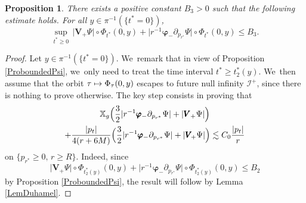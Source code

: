 \documentclass[10pt]{amsart}
\newcommand\mto{\mathchoice{\longmapsto}{\mapsto}{\mapsto}{\mapsto}}
\theoremstyle{plain}
\newtheorem{proposition}{Proposition}[section]
\theoremstyle{definition}
\newcommand\T{{\mathbb{X}}}
\begin{document}
\begin{proposition}\label{ProfinalPsideriv}
There exists a positive constant $B_3>0$ such that the following estimate holds. For all $y \in \pi^{-1}(\{t^* =0 \})$,
\[
\sup_{t^* \geq 0} \, \big| \pmb{V}_{\! +}\Psi \big|\circ \Phi_{t^*}(0,y)+\big|r^{-1} \pmb{\varphi}_- \partial_{p_{r^*}} \Psi \big|\circ \Phi_{t^*}(0,y) \leq B_3.
\]
\end{proposition}

\begin{proof}
Let $y \in \pi^{-1}(\{t^* =0 \})$. We~remark that in view of Proposition \ref{ProboundedPsi}, we~only need to treat the time interval $t^* \geq t_2^*(y)$. We~then assume that the orbit $\tau \mto \Phi_\tau(0,y)$ escapes to future null infinity $\mathcal{I}^+$, since there is nothing to prove otherwise. The key step consists in proving that
\begin{multline}\label{equation:toprove}
\T_g \Bigl(\frac{3}{2} | r^{-1} \pmb{\varphi}_- \partial_{p_{r^*}} \Psi|+| \pmb{V}_+ \Psi| \Bigr)\\
+ \frac{|p_t| }{4(r+6M)} \Bigl(\frac{3}{2} | r^{-1} \pmb{\varphi}_- \partial_{p_{r^*}} \Psi|+| \pmb{V}_{\! +} \Psi| \Bigr) \lesssim C_0\frac{|p_t|}{r }
\end{multline}
on $\{p_{r^*} \geq 0, \, r \geq R \}$. Indeed, since
\[
\big| \pmb{V}_{\! +}\Psi \big|\circ \Phi_{t^*_2(y)}(0,y)+\big|r^{-1} \pmb{\varphi}_- \partial_{p_{r^*}} \Psi \big|\circ \Phi_{t^*_2(y)}(0,y) \leq B_2
\]
by Proposition \ref{ProboundedPsi}, the result will follow by Lemma \ref{LemDuhamel}.


\end{proof}
\end{document}
